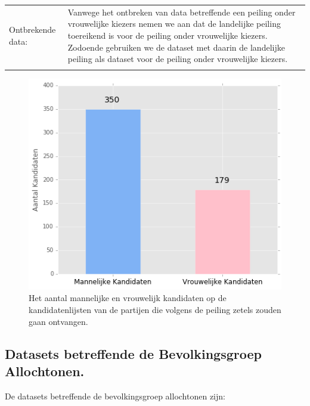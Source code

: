\noindent\begin{tabularx}{\textwidth}{LI}
Ontbrekende data:  & Vanwege het ontbreken van data betreffende een peiling onder vrouwelijke kiezers nemen we aan dat de landelijke peiling toereikend is voor de peiling onder vrouwelijke kiezers. Zodoende gebruiken we de dataset met daarin de landelijke peiling als dataset voor de peiling onder vrouwelijke kiezers. \\
  \\
\end{tabularx}
\begin{figure}[H]
\centering
	\includegraphics[width=0.42\linewidth]{mv_kandidaten.png}

			\caption{Het aantal mannelijke en vrouwelijk kandidaten op de kandidatenlijsten van de partijen die volgens de peiling zetels zouden gaan ontvangen.}

\label{fig:mvKandidaten}
\end{figure}



\subsection{Datasets betreffende de Bevolkingsgroep Allochtonen.}
De datasets betreffende de bevolkingsgroep allochtonen zijn:\\



